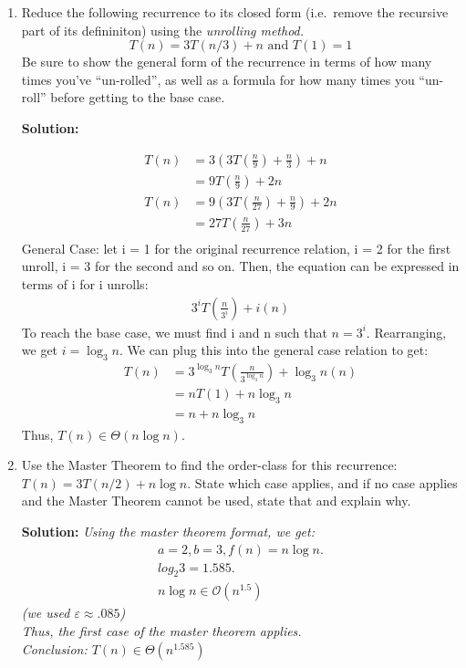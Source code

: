 \documentclass[10pt]{article}
\begin{document}
      \begin{enumerate}   
    
    	\item Reduce the following recurrence to its closed form (i.e.\ remove the recursive part of its defininiton) using the \emph{unrolling method.}
    	$$T(n) = 3 T(n/3) + n \textrm{ and } T(1) = 1$$
    	Be sure to show the general form of the recurrence in terms of how many times you've ``un-rolled'', as well as a formula for how many times you ``un-roll'' before getting to the base case.
    	
    	\textbf{Solution:}
    	
    	\begin{align*}
    	    T(n) &= 3\left( 3T\left(\frac{n}{9}\right) + \frac{n}{3} \right) + n \\
    	         &= 9T\left(\frac{n}{9}\right) + 2n \\
    	    T(n) &= 9\left(3T\left(\frac{n}{27}\right) + \frac{n}{9}\right)+ 2n \\
    	         &= 27T\left(\frac{n}{27}\right) + 3n \\
    	\end{align*}
    	General Case: let i = 1 for the original recurrence relation, i = 2 for the first unroll, i = 3 for the second and so on. Then, the equation can be expressed in terms of i for i unrolls: 
    	\begin{align*}
    	    3^{i}T\left(\frac{n}{3^{i}}\right) + i(n)
    	\end{align*}
    	To reach the base case, we must find i and n such that $n = 3^{i}$. Rearranging, we get $i = \log_3{n}$.
    	We can plug this into the general case relation to get:
    	\begin{align*}
    	    T(n) &= 3^{\log_3{n}}T\left(\frac{n}{3^{\log_3{n}}}\right) + \log_3{n}(n) \\
    	    &= nT(1) + n\log_3{n} \\
    	    &= n + n\log_3{n}
    	\end{align*}
    	Thus, $T(n) \in \Theta(n\log{n})$.
    
    	\item Use the Master Theorem to find the order-class for this recurrence: $T(n) = 3 T (n/2) + n \log n$.  State which case applies, and if no case applies and the Master Theorem cannot be used, state that and explain why.
    	
    	\textbf{Solution:}
    	\emph{
    	Using the master theorem format, we get:
    	\begin{align*}
    	    a = 2, b = 3, f(n) = n \log n. \\
    	    log_2{3} = 1.585. \\
    	    n\log{n} \in \mathcal{O}(n^{1.5})
    	\end{align*}
    	(we used $\varepsilon \approx .085$) \\
    	Thus, the first case of the master theorem applies. \\
    	Conclusion: $T(n) \in \Theta(n^{1.585})$
        }
        \pagebreak
        

\end{enumerate}
\end{document}
